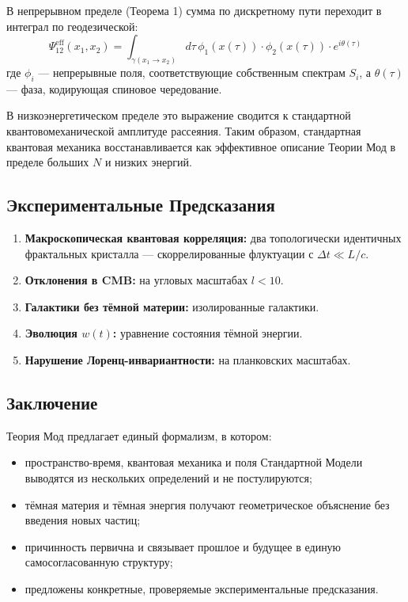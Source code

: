 \documentclass[12pt,a4paper]{article}
\begin{document}
В непрерывном пределе (Теорема 1) сумма по дискретному пути переходит в интеграл по геодезической:
\begin{equation}
    \Psi_{12}^{\text{eff}}(x_1, x_2) = \int_{\gamma(x_1 \to x_2)} d\tau \, \phi_1(x(\tau)) \cdot \phi_2(x(\tau)) \cdot e^{i\theta(\tau)}
\end{equation}
где $\phi_i$ --- непрерывные поля, соответствующие собственным спектрам $S_i$, а $\theta(\tau)$ --- фаза, кодирующая спиновое чередование.

В низкоэнергетическом пределе это выражение сводится к стандартной квантовомеханической амплитуде рассеяния. Таким образом, стандартная квантовая механика восстанавливается как эффективное описание Теории Мод в пределе больших $N$ и низких энергий.

\subsection{Экспериментальные Предсказания}
\begin{enumerate}[label=\arabic*.]
    \item \textbf{Макроскопическая квантовая корреляция:} два топологически идентичных фрактальных кристалла --- скоррелированные флуктуации с $\Delta t \ll L/c$.
    \item \textbf{Отклонения в CMB:} на угловых масштабах $l < 10$.
    \item \textbf{Галактики без тёмной материи:} изолированные галактики.
    \item \textbf{Эволюция $w(t)$:} уравнение состояния тёмной энергии.
    \item \textbf{Нарушение Лоренц-инвариантности:} на планковских масштабах.
\end{enumerate}

\subsection{Заключение}
Теория Мод предлагает единый формализм, в котором:
\begin{itemize}
    \item пространство-время, квантовая механика и поля Стандартной Модели выводятся из нескольких определений и не постулируются;
    \item тёмная материя и тёмная энергия получают геометрическое объяснение без введения новых частиц;
    \item причинность первична и связывает прошлое и будущее в единую самосогласованную структуру;
    \item предложены конкретные, проверяемые экспериментальные предсказания.
\end{itemize}
\end{document}
